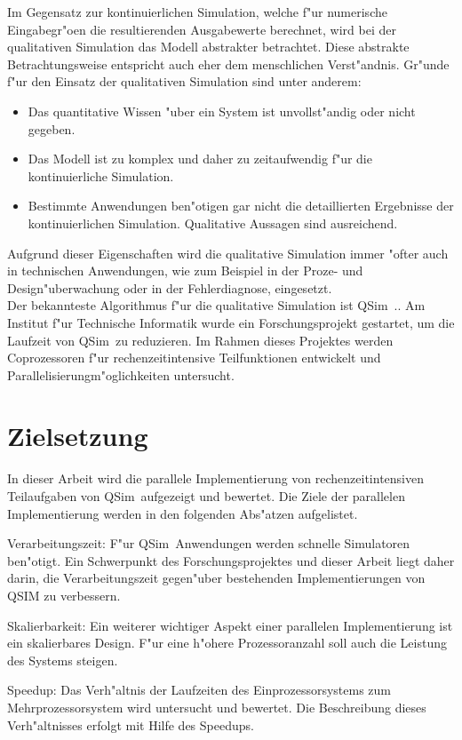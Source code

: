 \documentclass[11pt]{report}
\newcommand{\QSIM}{{\sc QSim}}
\begin{document}
Im Gegensatz zur kontinuierlichen Simulation, welche f"ur numerische 
Eingabegr"o\3en die resultierenden Ausgabewerte berechnet, wird bei der 
qualitativen Simulation das Modell abstrakter betrachtet.
Diese abstrakte Betrachtungsweise entspricht auch eher dem menschlichen
Verst"andnis.
Gr"unde f"ur den Einsatz der qualitativen Simulation sind unter anderem:

\begin{itemize}
\item Das quantitative Wissen "uber ein System ist unvollst"andig oder 
nicht gegeben. 
\item Das Modell ist zu komplex und daher zu zeitaufwendig f"ur die 
konti\-nuier\-liche  Simulation.
\item Bestimmte Anwendungen ben"otigen gar nicht die detaillierten Ergebnisse der kontinuierlichen Simulation. Qualitative Aussagen sind ausreichend. 
\end{itemize}

Aufgrund dieser Eigenschaften wird die qualitative Simulation immer "ofter 
auch in technischen Anwendungen, wie zum Beispiel in der Proze\3- und 
Design"uberwachung oder in der Fehlerdiagnose, eingesetzt. \\

Der bekannteste Algorithmus f"ur die qualitative Simulation ist 
\QSIM~\cite{Kui94}..
Am Institut f"ur Technische Informatik wurde ein Forschungsprojekt 
gestartet, um die Laufzeit von \QSIM\ zu reduzieren. 
Im Rahmen dieses Projektes werden Coprozessoren f"ur rechenzeitintensive 
Teilfunktionen entwickelt und Parallelisierungm"oglichkeiten untersucht.


\section{Zielsetzung}

In dieser Arbeit wird die parallele Implementierung von rechenzeitintensiven 
Teil\-aufgaben von \QSIM\ aufgezeigt und bewertet.  Die Ziele der parallelen 
Implementierung werden in den folgenden Abs"atzen aufgelistet.

\begin{description}
\item{Verarbeitungszeit:}
F"ur \QSIM\ Anwendungen werden schnelle Simulatoren be\-n"otigt.
Ein Schwerpunkt des Forschungsprojektes und dieser Arbeit liegt daher darin, 
die Verarbeitungszeit gegen"uber bestehenden Implementierungen von QSIM zu 
verbessern.
\item{Skalierbarkeit:}
Ein weiterer wichtiger Aspekt einer parallelen Implementierung ist ein 
skalierbares Design.  F"ur eine h"ohere Prozessoranzahl soll auch die 
Leistung des Systems steigen.
\item{Speedup:}
Das Verh"altnis der Laufzeiten des Einprozessorsystems zum Mehrprozessorsystem 
wird untersucht und bewertet. Die Beschreibung dieses Verh"altnisses erfolgt 
mit Hilfe des Speedups.
\end{description}
\end{document}
